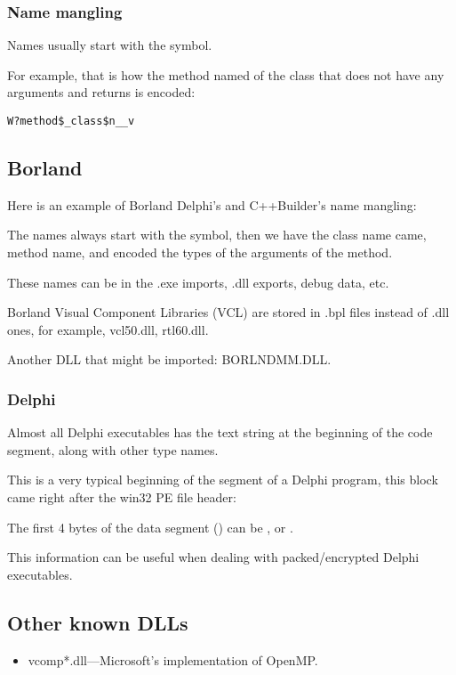 \subsubsection{Name mangling}

Names usually start with the  symbol.

For example, that is how the method named  of the class  that does not have any arguments and returns
\Tvoid is encoded:

\begin{lstlisting}
W?method$_class$n__v
\end{lstlisting}

\subsection{Borland}

Here is an example of Borland Delphi's and C++Builder's \gls{name mangling}:



The names always start with the  
symbol, then we have the class name came, method name, and encoded the types of the arguments of the method.

These names can be in the .exe imports, .dll exports, debug data, etc.

Borland Visual Component Libraries (VCL) 
are stored in .bpl files instead of .dll ones, for example, vcl50.dll, rtl60.dll.

Another DLL that might be imported: BORLNDMM.DLL.

\subsubsection{Delphi}

Almost all Delphi executables has the  text string at the beginning of the code segment, along with other type names.

This is a very typical beginning of the  
segment of a Delphi program, this block came right after the win32 PE file header:



The first 4 bytes of the data segment () can be ,  or .%

This information can be useful when dealing with packed/encrypted Delphi executables.

\subsection{Other known DLLs}

\begin{itemize}
\item vcomp*.dll---Microsoft's implementation of OpenMP.
\end{itemize}

